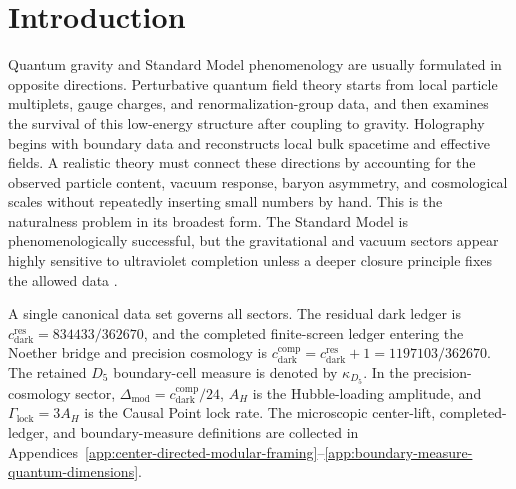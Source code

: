 \documentclass[11pt,letterpaper]{article}
\theoremstyle{plain}
\newcommand{\cdarkres}{c_{\text{dark}}^{\text{res}}}
\newcommand{\cdarkcomp}{c_{\text{dark}}^{\text{comp}}}
\newcommand{\DeltaMod}{\Delta_{\text{mod}}}
\newcommand{\GammaLock}{\Gamma_{\text{lock}}}
\newcommand{\AH}{A_H}
\newcommand{\kappad}{\kappa_{D_5}}
\begin{document}
\section{Introduction}
\label{sec:introduction}

Quantum gravity and Standard Model phenomenology are usually formulated in
opposite directions.  Perturbative quantum field theory starts from local
particle multiplets, gauge charges, and renormalization-group data, and then
examines the survival of this low-energy structure after coupling to gravity.
Holography begins with boundary data and reconstructs local bulk spacetime and
effective fields.  A realistic theory must connect these directions by
accounting for the observed particle content, vacuum response,
baryon asymmetry, and cosmological scales without repeatedly inserting small
numbers by hand.  This is the naturalness problem in its broadest form.  The
Standard Model is phenomenologically successful, but the gravitational and
vacuum sectors appear highly sensitive to ultraviolet completion unless a
deeper closure principle fixes the allowed data
\cite{barbieri1988,weinberg1989,pdg2024}.

A single canonical data set governs all sectors.  The residual
dark ledger is
\(\cdarkres=834433/362670\), and the completed finite-screen ledger entering
the Noether bridge and precision cosmology is
\(\cdarkcomp=\cdarkres+1=1197103/362670\).  The retained \(D_5\)
boundary-cell measure is denoted by \(\kappad\).  In the precision-cosmology
sector, \(\DeltaMod=\cdarkcomp/24\), \(\AH\) is the Hubble-loading amplitude,
and \(\GammaLock=3\AH\) is the Causal Point lock rate.  The microscopic
center-lift, completed-ledger, and boundary-measure definitions are collected in
Appendices~\ref{app:center-directed-modular-framing}--\ref{app:boundary-measure-quantum-dimensions}.
\end{document}
